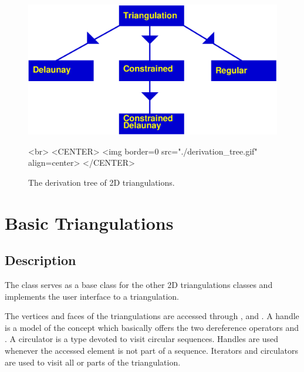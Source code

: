 \begin{figure}
\begin{ccTexOnly}
\begin{center}
\includegraphics[width=13cm]{derivation_tree.eps} 
\end{center}
\end{ccTexOnly}
\caption{The derivation tree of 2D triangulations.}
\label{2D_Triangulation_Fig_derivation_tree}
\begin{ccHtmlOnly}
<br>
<CENTER>
<img border=0 src="./derivation_tree.gif" align=center>
</CENTER>
\end{ccHtmlOnly}
\end{figure}

\section{Basic Triangulations}
\label{Section_2D_Triangulations_Basic}

\subsection{Description}
\label{Subsection_2D_Triangulations_Basic_Description}

The class 
serves as a base class for the other
2D triangulations classes
and 
 implements the user
interface to a triangulation.




The vertices and faces of the triangulations are accessed through 
,
 and .
A handle is a model of the concept  which basically
offers the two dereference operators  \ccc{*}  and \ccc{->} .
A circulator is a type devoted to visit circular sequences.
Handles are used whenever the accessed element 
is not part of a sequence.
Iterators  and circulators are used
to visit  all or parts of the triangulation.


